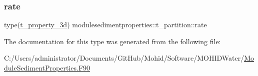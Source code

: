 \mbox{\label{structmodulesedimentproperties_1_1t__partition_a11c3ad3097cd5a81fb0d7da22351eb8e}} 
\subsubsection{\texorpdfstring{rate}{rate}}
{\footnotesize\ttfamily type(\mbox{\hyperlink{structmodulesedimentproperties_1_1t__property__3d}{t\+\_\+property\+\_\+3d}}) modulesedimentproperties\+::t\+\_\+partition\+::rate\hspace{0.3cm}{\ttfamily [private]}}



The documentation for this type was generated from the following file\+:\begin{DoxyCompactItemize}
\item 
C\+:/\+Users/administrator/\+Documents/\+Git\+Hub/\+Mohid/\+Software/\+M\+O\+H\+I\+D\+Water/\mbox{\hyperlink{_module_sediment_properties_8_f90}{Module\+Sediment\+Properties.\+F90}}\end{DoxyCompactItemize}
